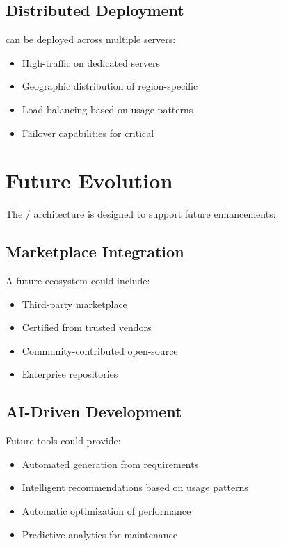 \subsection{Distributed Deployment}

 can be deployed across multiple servers:
\begin{itemize}
\item High-traffic  on dedicated servers
\item Geographic distribution of region-specific 
\item Load balancing based on \webbaselet{} usage patterns
\item Failover capabilities for critical 
\end{itemize}

\section{Future Evolution}
\label{sec:future-evolution}

The \webbase{}/\webbaselet{} architecture is designed to support future enhancements:

\subsection{Marketplace Integration}

A future ecosystem could include:
\begin{itemize}
\item Third-party \webbaselet{} marketplace
\item Certified  from trusted vendors
\item Community-contributed open-source 
\item Enterprise \webbaselet{} repositories
\end{itemize}

\subsection{AI-Driven Development}

Future tools could provide:
\begin{itemize}
\item Automated \webbaselet{} generation from requirements
\item Intelligent \webbaselet{} recommendations based on usage patterns
\item Automatic optimization of \webbaselet{} performance
\item Predictive analytics for \webbaselet{} maintenance
\end{itemize}

